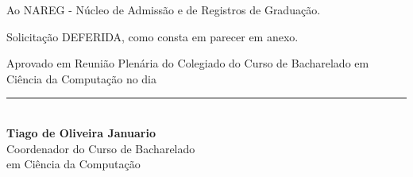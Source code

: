 \documentclass[10pt]{scrartcl}
\begin{document}
Ao NAREG - Núcleo de Admissão e de Registros de Gradua\c{c}ão.

\vspace{1cm}

Solicita\c{c}ão DEFERIDA, como consta em parecer em anexo. 

Aprovado em Reunião Plenária do Colegiado do Curso de Bacharelado em Ciência da Computa\c{c}ão no dia 

\begin{flushright}
\end{flushright}
\vspace{1cm}

\begin{center}
\rule{6cm}{0.5pt} \\
\textbf{Tiago de Oliveira Januario} \\
Coordenador do Curso de Bacharelado\\
 em Ciência da Computa\c{c}ão
\end{center}



\vspace{1cm}
\end{document}
